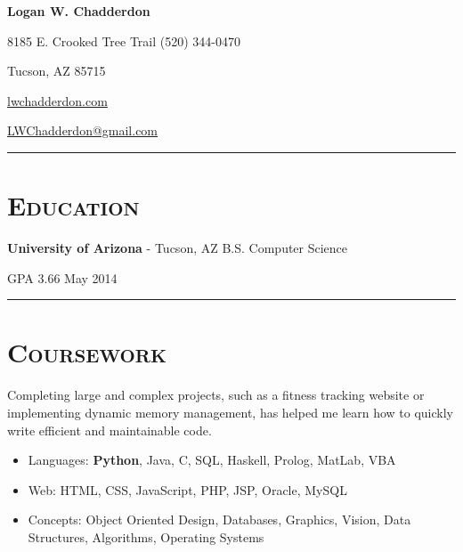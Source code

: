 \documentclass[11pt,letterpaper]{article}
\newcommand{\Hsep}{\color[rgb]{0.6, 0.6, 0.6} \vspace{4mm} \hrule \vspace{-2mm} \color{black}}
\begin{document}
\begin{minipage}{\textwidth}

\begin{center}
\LARGE \bfseries Logan W. Chadderdon
\end{center}

8185 E. Crooked Tree Trail \hfill (520) 344-0470

\vspace{-3mm}
\begin{multicols}{3}
Tucson, AZ 85715 

\begin{center}
\href{http://lwchadderdon.com}{lwchadderdon.com}
\end{center}

\hfill \href{mailto:LWChadderdon@gmail.com}{LWChadderdon@gmail.com}

\end{multicols}


\vspace{-1mm}
\color[rgb]{0.6, 0.6, 0.6}
\hrule
\color{black}
\vspace{-1mm}

\section{\scshape Education}
\vspace{-2mm}
{\bfseries University of Arizona} - Tucson, AZ \hfill B.S. Computer Science

GPA 3.66 \hfill May 2014

\vspace{-1mm}
\Hsep

\section{\scshape Coursework}
\vspace{-3mm}
Completing large and complex projects, such as a fitness tracking website or 
implementing dynamic memory management, has helped me learn how to quickly write 
efficient and maintainable code.
\vspace{2mm}
\begin{itemize}
 \item Languages: {\bfseries Python}, Java, C, SQL, Haskell, Prolog, MatLab, VBA
 \item Web: HTML, CSS, JavaScript, PHP, JSP, Oracle, MySQL
 \item Concepts: Object Oriented Design, Databases, Graphics, Vision, Data Structures,
 Algorithms, Operating Systems
\end{itemize}
\vspace{-3mm}

\end{minipage}
\end{document}
